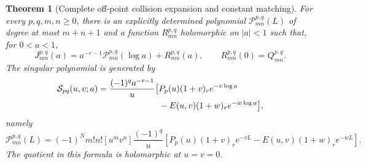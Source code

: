 \documentclass[11pt,a4paper]{article}
\numberwithin{equation}{section}
\newtheorem{theorem}{Theorem}[section]
\theoremstyle{definition}
\begin{document}
\begin{theorem}[Complete off-point collision expansion and constant matching]\label{csc:collision}
For every $p,q,m,n\ge0$, there is an explicitly determined polynomial
$\mathcal P_{mn}^{p,q}(L)$ of degree at most $m+n+1$ and a function
$R_{mn}^{p,q}$ holomorphic on $|a|<1$ such that, for $0<a<1$,
\begin{equation}\label{csc:collisionformula}
J_{mn}^{p,q}(a)=a^{-r-1}\mathcal P_{mn}^{p,q}(\log a)+R_{mn}^{p,q}(a),
\qquad R_{mn}^{p,q}(0)=Q_{mn}^{p,q}.
\end{equation}
The singular polynomial is generated by
\begin{align}
\mathcal S_{pq}(u,v;a)=\frac{(-1)^q a^{-r-1}}u\big[&
P_p(u)(1+v)_r e^{-v\log a}\notag\\
&-E(u,v)(1+w)_r e^{-w\log a}\big],\label{csc:Sgenerator}
\end{align}
namely
\begin{equation}\label{csc:Pextract}
\mathcal P_{mn}^{p,q}(L)=(-1)^Nm!n![u^mv^n]
\frac{(-1)^q}{u}\left[P_p(u)(1+v)_r e^{-vL}-E(u,v)(1+w)_r e^{-wL}\right].
\end{equation}
The quotient in this formula is holomorphic at $u=v=0$.
\end{theorem}
\end{document}
